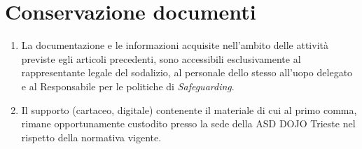 \documentclass{djtsdoc}
\begin{document}
	\section{Conservazione documenti}
	\begin{enumerate}
		\item La documentazione e le informazioni acquisite nell'ambito delle attività previste egli articoli precedenti, sono accessibili esclusivamente al rappresentante legale del sodalizio, al personale dello stesso all'uopo delegato e al Responsabile per le politiche di \textit{Safeguarding}.
		\item Il supporto (cartaceo, digitale) contenente il materiale di cui al primo comma, rimane opportunamente custodito presso la sede della ASD DOJO Trieste  nel rispetto della normativa vigente.
	\end{enumerate}
	
\end{document}
